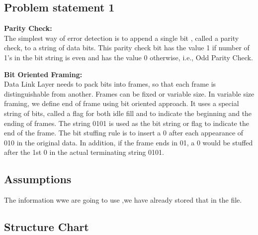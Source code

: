 \documentclass[12pt]{article}
\begin{document}
  
\newpage
\tableofcontents
\pagebreak
\begin{flushleft}


\section{ Problem statement 1}

\end{flushleft}
\begin{flushleft}
\textbf{Parity Check:\\}
The simplest way of error detection is to append a single bit , called a parity check, to a string of data bits. This parity check bit has the value 1 if number of 1’s in the bit string is even and has the value 0 otherwise, i.e., Odd Parity Check.

\textbf{Bit Oriented Framing:\\}
Data Link Layer needs to pack bits into frames, so that each frame is distinguishable from another. Frames can be fixed or variable size. In variable size framing, we define end of frame using bit oriented approach. It uses a special string of bits, called a flag for both idle fill and to indicate the beginning and the ending of frames.
The string 0101 is used as the bit string or flag to indicate the end of the frame. The bit stuffing rule is to insert a 0 after each appearance of 010 in the original data. In addition, if the frame ends in 01, a 0 would be stuffed after the 1st 0 in the actual terminating string 0101.








\end{flushleft}

\begin{flushleft}


\subsection{Assumptions}
\begin{flushleft}
The information wwe are going to use ,we have already stored that in the file.
\end{flushleft}


\end{flushleft}



\begin{flushleft}


\subsection{Structure Chart}
\begin{center}

\end{center}
\end{flushleft}
\end{document}
